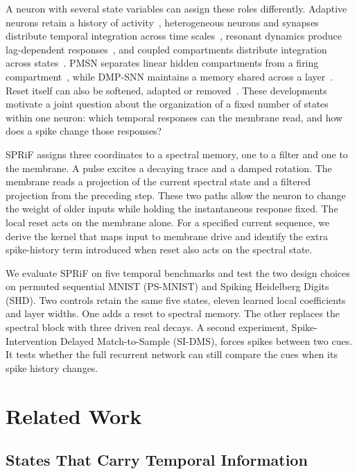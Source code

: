 \documentclass[letterpaper,journal]{IEEEtran}
\begin{document}
A neuron with several state variables can assign these roles differently. Adaptive neurons retain a history of activity~\cite{asrnn,adlif}, heterogeneous neurons and synapses distribute temporal integration across time scales~\cite{heterogeneity,hetsyn}, resonant dynamics produce lag-dependent responses~\cite{izhikevich_rf,brf,drf}, and coupled compartments distribute integration across states~\cite{tclif,dhsnn}. PMSN separates linear hidden compartments from a firing compartment~\cite{pmsn2026}, while DMP-SNN maintains a memory shared across a layer~\cite{sun2026dmp}. Reset itself can also be softened, adapted or removed~\cite{inflor,arlif,psn}. These developments motivate a joint question about the organization of a fixed number of states within one neuron: which temporal responses can the membrane read, and how does a spike change those responses?

SPRiF assigns three coordinates to a spectral memory, one to a filter and one to the membrane. A pulse excites a decaying trace and a damped rotation. The membrane reads a projection of the current spectral state and a filtered projection from the preceding step. These two paths allow the neuron to change the weight of older inputs while holding the instantaneous response fixed. The local reset acts on the membrane alone. For a specified current sequence, we derive the kernel that maps input to membrane drive and identify the extra spike-history term introduced when reset also acts on the spectral state.

We evaluate SPRiF on five temporal benchmarks and test the two design choices on permuted sequential MNIST (PS-MNIST) and Spiking Heidelberg Digits (SHD). Two controls retain the same five states, eleven learned local coefficients and layer widths. One adds a reset to spectral memory. The other replaces the spectral block with three driven real decays. A second experiment, Spike-Intervention Delayed Match-to-Sample (SI-DMS), forces spikes between two cues. It tests whether the full recurrent network can still compare the cues when its spike history changes.

\section{Related Work}
\label{sec:related}

\subsection{States That Carry Temporal Information}
\end{document}
